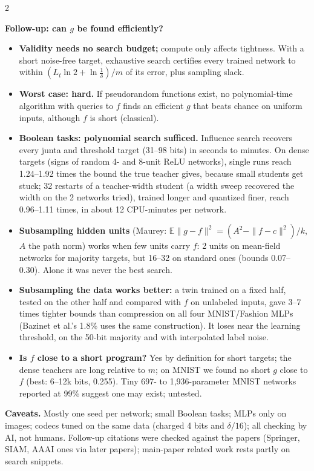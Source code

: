 \documentclass[10pt,a4paper]{article}
\newcommand{\head}[1]{\par{\large\bfseries #1}\par\smallskip}
\newcommand{\sub}[1]{{\bfseries #1}\enspace}
\begin{document}
\begin{multicols}{2}
\columnbreak
\head{Follow-up: can $g$ be found efficiently?}
\begin{itemize}
\item \sub{Validity needs no search budget;} compute only affects tightness. With a short noise-free target, exhaustive search certifies every trained network to within $(L_t\ln2+\ln\frac1\delta)/m$ of its error, plus sampling slack.
\item \sub{Worst case: hard.} If pseudorandom functions exist, no polynomial-time algorithm with queries to $f$ finds an efficient $g$ that beats chance on uniform inputs, although $f$ is short (classical).
\item \sub{Boolean tasks: polynomial search sufficed.} Influence search recovers every junta and threshold target (31--98 bits) in seconds to minutes. On dense targets (signs of random 4- and 8-unit ReLU networks), single runs reach 1.24--1.92 times the bound the true teacher gives, because small students get stuck; 32 restarts of a teacher-width student (a width sweep recovered the width on the 2 networks tried), trained longer and quantized finer, reach 0.96--1.11 times, in about 12 CPU-minutes per network.
\item \sub{Subsampling hidden units} (Maurey: $\mathbb E\|g-f\|^2=(A^2-\|f-c\|^2)/k$, $A$ the path norm) works when few units carry $f$: 2 units on mean-field networks for majority targets, but 16--32 on standard ones (bounds 0.07--0.30). Alone it was never the best search.
\item \sub{Subsampling the data works better:} a twin trained on a fixed half, tested on the other half and compared with $f$ on unlabeled inputs, gave 3--7 times tighter bounds than compression on all four MNIST/Fashion MLPs (Bazinet et al.'s 1.8\% uses the same construction). It loses near the learning threshold, on the 50-bit majority and with interpolated label noise.
\item \sub{Is $f$ close to a short program?} Yes by definition for short targets; the dense teachers are long relative to $m$; on MNIST we found no short $g$ close to $f$ (best: 6--12k bits, 0.255). Tiny 697- to 1,936-parameter MNIST networks reported at 99\% suggest one may exist; untested.
\end{itemize}
\end{multicols}

\vspace{-4pt}
{\footnotesize\sub{Caveats.} Mostly one seed per network; small Boolean tasks; MLPs only on images; codecs tuned on the same data (charged 4 bits and $\delta/16$); all checking by AI, not humans. Follow-up citations were checked against the papers (Springer, SIAM, AAAI ones via later papers); main-paper related work rests partly on search snippets.}
\end{document}
